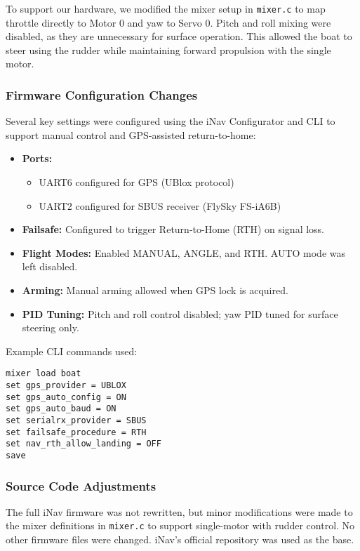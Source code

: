 To support our hardware, we modified the mixer setup in \texttt{mixer.c} to map throttle directly to Motor 0 and yaw to Servo 0. Pitch and roll mixing were disabled, as they are unnecessary for surface operation. This allowed the boat to steer using the rudder while maintaining forward propulsion with the single motor.

\subsubsection*{Firmware Configuration Changes}

Several key settings were configured using the iNav Configurator and CLI to support manual control and GPS-assisted return-to-home:

\begin{itemize}
    \item \textbf{Ports:}
    \begin{itemize}
        \item UART6 configured for GPS (UBlox protocol)
        \item UART2 configured for SBUS receiver (FlySky FS-iA6B)
    \end{itemize}
    \item \textbf{Failsafe:} Configured to trigger Return-to-Home (RTH) on signal loss.
    \item \textbf{Flight Modes:} Enabled MANUAL, ANGLE, and RTH. AUTO mode was left disabled.
    \item \textbf{Arming:} Manual arming allowed when GPS lock is acquired.
    \item \textbf{PID Tuning:} Pitch and roll control disabled; yaw PID tuned for surface steering only.
\end{itemize}

Example CLI commands used:

\begin{lstlisting}
mixer load boat
set gps_provider = UBLOX
set gps_auto_config = ON
set gps_auto_baud = ON
set serialrx_provider = SBUS
set failsafe_procedure = RTH
set nav_rth_allow_landing = OFF
save
\end{lstlisting}

\subsubsection*{Source Code Adjustments}

The full iNav firmware was not rewritten, but minor modifications were made to the mixer definitions in \texttt{mixer.c} to support single-motor with rudder control. No other firmware files were changed. iNav’s official repository was used as the base.

